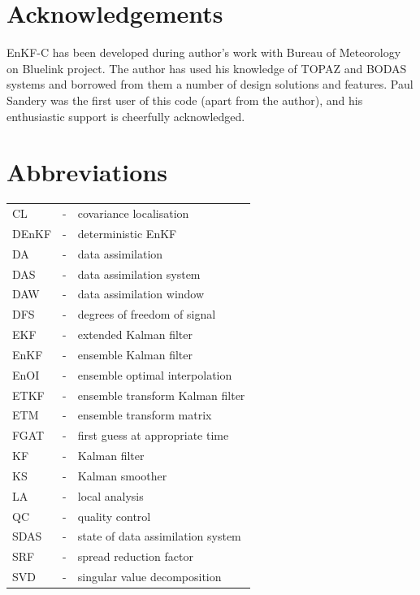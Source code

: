 \documentclass[11pt]{report}
\begin{document}
\chapter*{Acknowledgements}

EnKF-C has been developed during author's work with Bureau of Meteorology on Bluelink project.
The author has used his knowledge of TOPAZ \citep{sak12b} and BODAS \citep{oke08b} systems and borrowed from them a number of design solutions and features.
Paul Sandery was the first user of this code (apart from the author), and his enthusiastic support is cheerfully acknowledged.

\clearpage

\nocite{eve94a}
\nocite{eve03a}
\nocite{hun04a}
\nocite{hun07a}
\nocite{sak08a}
\nocite{sak10a}
\nocite{sak11a}




\clearpage

\chapter*{Abbreviations}

\begin{tabular}{lll}
  CL &-& covariance localisation \\
  DEnKF &-& deterministic EnKF \\
  DA &-& data assimilation \\
  DAS &-& data assimilation system \\
  DAW &-& data assimilation window \\
  DFS &-& degrees of freedom of signal \\
  EKF &-& extended Kalman filter \\
  EnKF &-& ensemble Kalman filter \\
  EnOI &-& ensemble optimal interpolation \\
  ETKF &-& ensemble transform Kalman filter \\
  ETM &-& ensemble transform matrix \\
  FGAT &-& first guess at appropriate time \\
  KF &-& Kalman filter \\
  KS &-& Kalman smoother \\
  LA &-& local analysis \\
  QC &-& quality control \\
  SDAS &-& state of data assimilation system \\
  SRF &-& spread reduction factor \\
  SVD &-& singular value decomposition \\
\end{tabular}
\end{document}
